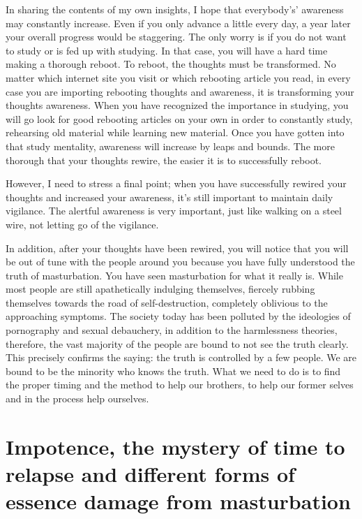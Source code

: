 \documentclass[
]{book}
\begin{document}
In sharing the contents of my own insights, I hope that everybody's' awareness may constantly increase. Even if you only advance a little every day, a year later your overall progress would be staggering. The only worry is if you do not want to study or is fed up with studying. In that case, you will have a hard time making a thorough reboot. To reboot, the thoughts must be transformed. No matter which internet site you visit or which rebooting article you read, in every case you are importing rebooting thoughts and awareness, it is transforming your thoughts awareness. When you have recognized the importance in studying, you will go look for good rebooting articles on your own in order to constantly study, rehearsing old material while learning new material. Once you have gotten into that study mentality, awareness will increase by leaps and bounds. The more thorough that your thoughts rewire, the easier it is to successfully reboot.

However, I need to stress a final point; when you have successfully rewired your thoughts and increased your awareness, it's still important to maintain daily vigilance. The alertful awareness is very important, just like walking on a steel wire, not letting go of the vigilance.

In addition, after your thoughts have been rewired, you will notice that you will be out of tune with the people around you because you have fully understood the truth of masturbation. You have seen masturbation for what it really is. While most people are still apathetically indulging themselves, fiercely rubbing themselves towards the road of self-destruction, completely oblivious to the approaching symptoms. The society today has been polluted by the ideologies of pornography and sexual debauchery, in addition to the harmlessness theories, therefore, the vast majority of the people are bound to not see the truth clearly. This precisely confirms the saying: the truth is controlled by a few people. We are bound to be the minority who knows the truth. What we need to do is to find the proper timing and the method to help our brothers, to help our former selves and in the process help ourselves.

\hypertarget{impotence-the-mystery-of-time-to-relapse-and-different-forms-of-essence-damage-from-masturbation}{%
\chapter{Impotence, the mystery of time to relapse and different forms of essence damage from masturbation}\label{impotence-the-mystery-of-time-to-relapse-and-different-forms-of-essence-damage-from-masturbation}}
\end{document}
